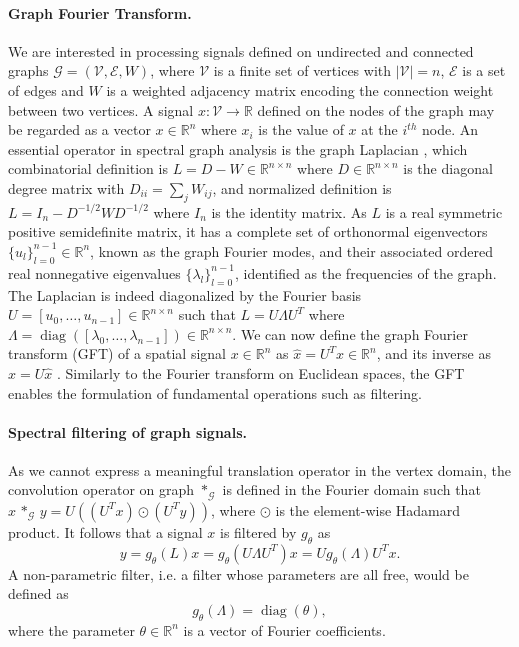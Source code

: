 \documentclass{article}
\DeclareMathOperator*{\diag}{diag}
\newcommand{\G}{\mathcal{G}}
\newcommand{\V}{\mathcal{V}}
\newcommand{\E}{\mathcal{E}}
\newcommand{\bO}{\mathcal{O}}
\newcommand{\R}{\mathbb{R}}
\begin{document}

\paragraph{Graph Fourier Transform.} We are interested in processing signals
defined on undirected and connected graphs $\G=(\V,\E,W)$, where $\V$ is a
finite set of vertices with $|\V|=n$, $\E$ is a set of edges and $W$ is a
weighted adjacency matrix encoding the connection weight between two vertices. A
signal $x: \V \rightarrow \R$ defined on the nodes of the graph may be regarded
as a vector $x \in \R^n$ where $x_i$ is the value of $x$ at the $i^{th}$ node.
An essential operator in spectral graph analysis is the graph Laplacian
\cite{book:Chung97Spectral}, which combinatorial definition is $L = D - W \in
\R^{n \times n}$ where $D \in \R^{n \times n}$ is the diagonal degree matrix
with $D_{ii} = \sum_j W_{ij}$, and normalized definition is $L = I_n -
D^{-1/2} W D^{-1/2}$ where $I_n$ is the identity matrix. As $L$ is a real
symmetric positive semidefinite matrix, it has a complete set of orthonormal
eigenvectors $\{u_l\}_{l=0}^{n-1} \in \R^n$, known as the graph Fourier modes,
and their associated ordered real nonnegative eigenvalues
$\{\lambda_l\}_{l=0}^{n-1}$, identified as the frequencies of the graph. The
Laplacian is indeed diagonalized by the Fourier basis $U=[u_0, \ldots, u_{n-1}]
\in \R^{n \times n}$ such that $L = U \Lambda U^T$ where $\Lambda =
\diag([\lambda_0, \ldots, \lambda_{n-1}]) \in \R^{n \times n}$. We can now
define the graph Fourier transform (GFT) of a spatial signal $x \in \R^n$ as
$\hat{x} = U^T x \in \R^n$, and its inverse as $x = U \hat{x}$
\cite{art:ShumanNarangFrossardOrtegaVandergheynst13ReviewSPG}. Similarly to the
Fourier transform on Euclidean spaces, the GFT enables the formulation of
fundamental operations such as filtering.

\paragraph{Spectral filtering of graph signals.} As we cannot express a
meaningful translation operator in the vertex domain, the convolution operator
on graph $\ast_\G$ is defined in the Fourier domain such that $x \,\ast_\G\, y =
U((U^Tx) \odot (U^Ty))$, where $\odot$ is the element-wise Hadamard product. It
follows that a signal $x$ is filtered by $g_\theta$ as
\begin{equation}
	y = g_\theta(L) x = g_\theta(U \Lambda U^T) x = U g_\theta(\Lambda) U^T x.
\end{equation}
A non-parametric filter, i.e. a filter whose parameters
are all free, would be defined as
\begin{equation} \label{eq:filt_non-param}
	g_\theta(\Lambda) = \diag(\theta),
\end{equation}
where the parameter $\theta \in \R^n$ is a vector of Fourier coefficients.
\end{document}
